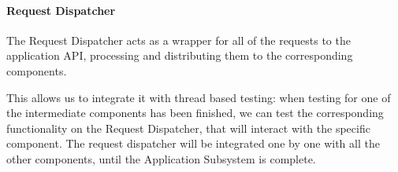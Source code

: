 \documentclass[english]{article}
\begin{document}
\begin{figure}[H]
	\centering
\end{figure}
\begin{figure}[H]
	\centering
\end{figure}


\paragraph{Request Dispatcher}
The Request Dispatcher acts as a wrapper for all of the requests to the application API, processing and distributing them to the corresponding components. 

This allows us to integrate it with thread based testing: when testing for one of the intermediate components has been finished, we can test the corresponding functionality on the Request Dispatcher, that will interact with the specific component.
The request dispatcher will be integrated one by one with all the other components, until the Application Subsystem is complete.
\end{document}
